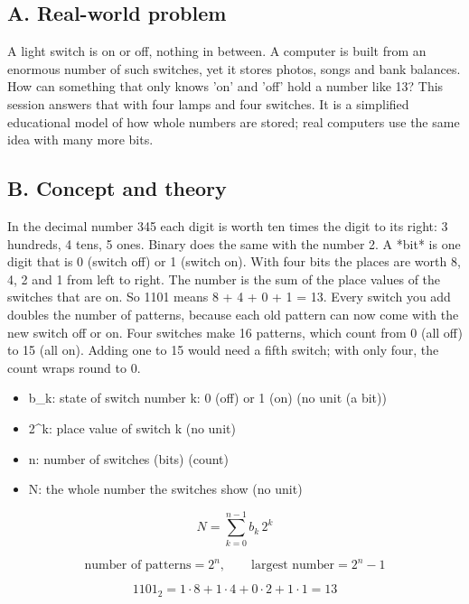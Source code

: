 \documentclass[11pt,a4paper]{article}
\begin{document}
\subsection*{A. Real-world problem}
A light switch is on or off, nothing in between. A computer is built from an enormous number of such switches, yet it stores photos, songs and bank balances. How can something that only knows 'on' and 'off' hold a number like 13? This session answers that with four lamps and four switches. It is a simplified educational model of how whole numbers are stored; real computers use the same idea with many more bits.

\subsection*{B. Concept and theory}
In the decimal number 345 each digit is worth ten times the digit to its right: 3 hundreds, 4 tens, 5 ones. Binary does the same with the number 2. A *bit* is one digit that is 0 (switch off) or 1 (switch on). With four bits the places are worth 8, 4, 2 and 1 from left to right. The number is the sum of the place values of the switches that are on. So 1101 means 8 + 4 + 0 + 1 = 13. Every switch you add doubles the number of patterns, because each old pattern can now come with the new switch off or on. Four switches make 16 patterns, which count from 0 (all off) to 15 (all on). Adding one to 15 would need a fifth switch; with only four, the count wraps round to 0.

\begin{itemize}[nosep]
\item b\_k: state of switch number k: 0 (off) or 1 (on) (no unit (a bit))
\item 2\textasciicircum{}k: place value of switch k (no unit)
\item n: number of switches (bits) (count)
\item N: the whole number the switches show (no unit)
\end{itemize}

\begin{equation*}
N=\sum_{k=0}^{n-1} b_k\,2^{k}
\end{equation*}

\begin{equation*}
\text{number of patterns}=2^{n},\qquad \text{largest number}=2^{n}-1
\end{equation*}

\begin{equation*}
1101_2 = 1\cdot 8+1\cdot 4+0\cdot 2+1\cdot 1=13
\end{equation*}
\end{document}
